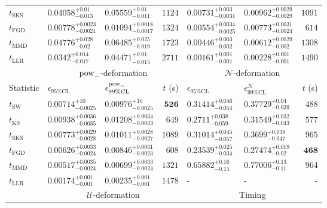 \begin{tabular}{l|llr|llr}
	$t_{\mathrm{SKS}}$ & $0.04058_{-0.013}^{+0.01}$ & $0.05559_{-0.011}^{+0.01}$ & $1124$ & $0.00731_{-0.0031}^{+0.003}$ & $0.00962_{-0.0029}^{+0.0029}$ & $1091$ \\
	$t_{\mathrm{FGD}}$ & ${\mathbf{0.00778_{-0.0021}^{+0.0023}}}$ & ${\mathbf{0.01094_{-0.0017}^{+0.0018}}}$ & $1324$ & $0.00554_{-0.0025}^{+0.0034}$ & $0.00773_{-0.0024}^{+0.0031}$ & $614$ \\
	$t_{\mathrm{MMD}}$ & $0.04776_{-0.02}^{+0.028}$ & $0.06485_{-0.019}^{+0.025}$ & $1723$ & ${\mathbf{0.00446_{-0.002}^{+0.003}}}$ & ${\mathbf{0.00612_{-0.002}^{+0.0029}}}$ & $1308$ \\
	$t_{\mathrm{LLR}}$ & $0.0342_{-0.017}^{+0.014}$ & $0.04471_{-0.015}^{+0.01}$ & $2711$ & $0.00161_{-0.001}^{+0.001}$ & $0.00228_{-0.001}^{+0.001}$ & $1490$ \\
	\toprule
	\multicolumn{1}{c}{} & \multicolumn{3}{c}{$\rm{pow}_{-}$-deformation} & \multicolumn{3}{c}{$\mathcal{N}$-deformation} \\
	Statistic & $\epsilon_{95\%\mathrm{CL}}$ & $\epsilon^  {\rm{pow}_{-}}_{99\%\mathrm{CL}}$ & $t$ (s) & $\epsilon_{95\%\mathrm{CL}}$ & $\epsilon^    {\mathcal{N}}_{99\%\mathrm{CL}}$ & $t$ (s) \\
	\midrule
	$t_{\mathrm{SW}}$ & $0.00714_{-0.0025}^{+10}$ & $0.00976_{-0.0025}^{+10}$ & ${\mathbf{526}}$ & $0.31414_{-0.054}^{+0.046}$ & $0.37729_{-0.039}^{+0.04}$ & $488$ \\
	$t_{\overline{\mathrm{KS}}}$ & $0.00938_{-0.0035}^{+0.0036}$ & $0.01208_{-0.0033}^{+0.0034}$ & $649$ & $0.2711_{-0.059}^{+0.038}$ & $0.31549_{-0.043}^{+0.032}$ & $577$ \\
	$t_{\mathrm{SKS}}$ & $0.00773_{-0.0028}^{+0.0029}$ & $0.01011_{-0.0027}^{+0.0028}$ & $1089$ & $0.31014_{-0.057}^{+0.045}$ & $0.3699_{-0.047}^{+0.038}$ & $965$ \\
	$t_{\mathrm{FGD}}$ & $0.00626_{-0.0024}^{+0.0033}$ & $0.00846_{-0.0023}^{+0.0031}$ & $608$ & ${\mathbf{0.23539_{-0.034}^{+0.025}}}$ & ${\mathbf{0.27474_{-0.02}^{+0.019}}}$ & ${\mathbf{468}}$ \\
	$t_{\mathrm{MMD}}$ & ${\mathbf{0.00517_{-0.0024}^{+0.0035}}}$ & ${\mathbf{0.00699_{-0.0024}^{+0.0033}}}$ & $1321$ & $0.65882_{-0.15}^{+0.16}$ & $0.77006_{-0.11}^{+0.13}$ & $964$ \\
	$t_{\mathrm{LLR}}$ & $0.00174_{-0.001}^{+0.001}$ & $0.00235_{-0.001}^{+0.001}$ & $1478$ & - & - & - \\
	\toprule
	\multicolumn{1}{c}{} & \multicolumn{3}{c}{$\mathcal{U}$-deformation} & \multicolumn{3}{c}{Timing} \\

\end{tabular}
